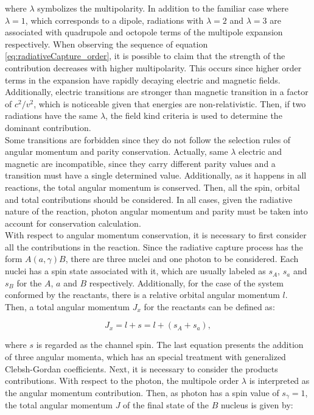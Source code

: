 \documentclass[openany]{book}
\begin{document}
where $\lambda$ symbolizes the multipolarity. In addition to the familiar case where $\lambda = 1$, which corresponds to a dipole, radiations with $\lambda = 2$ and $\lambda = 3$ are associated with quadrupole and octopole terms of the multipole expansion respectively. When observing the sequence of equation \ref{eq:radiativeCapture_order}, it is possible to claim that the strength of the contribution decreases with higher multipolarity. This occurs since higher order terms in the expansion have rapidly decaying electric and magnetic fields. Additionally, electric transitions are stronger than magnetic transition in a factor of $c^2/v^2$, which is noticeable given that energies are non-relativistic. Then, if two radiations have the same $\lambda$, the field kind criteria is used to determine the dominant contribution. \\

Some transitions are forbidden since they do not follow the selection rules of angular momentum and parity conservation. Actually, same $\lambda$ electric and magnetic are incompatible, since they carry different parity values and a transition must have a single determined value. Additionally, as it happens in all reactions, the total angular momentum is conserved. Then, all the spin, orbital and total  contributions should be considered. In all cases, given the radiative nature of the reaction, photon angular momentum and parity must be taken into account for conservation calculation. \\

With respect to angular momentum conservation, it is necessary to first consider all the contributions in the reaction. Since the radiative capture process has the form $A(a, \gamma)B$, there are three nuclei and one photon to be considered. Each nuclei has a spin state associated with it, which are usually labeled as $s_A$, $s_a$ and $s_B$ for the $A$, $a$ and $B$ respectively. Additionally, for the case of the system conformed by the reactants, there is a relative orbital angular momentum $l$. Then, a total angular momentum $J_x$ for the reactants can be defined as: 

\begin{equation}  \label{eq:radiativeCapture_angularMomentum_reactants}
	J_x = l + s = l + (s_A + s_a),
\end{equation}

where $s$ is regarded as the channel spin. The last equation presents the addition of three angular momenta, which has an special treatment with generalized Clebsh-Gordan coefficients. Next, it is necessary to consider the products contributions. With respect to the photon, the multipole order $\lambda$ is interpreted as the angular momentum contribution. Then, as photon has a spin value of $s_\gamma = 1$, the total angular momentum $J$ of the final state of the $B$ nucleus is given by: 
\end{document}
